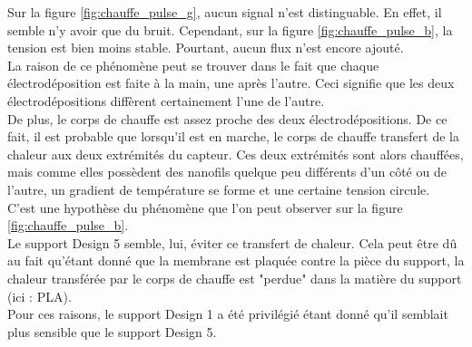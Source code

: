 Sur la figure \ref{fig:chauffe_pulse_g}, aucun signal n'est distinguable. En effet, il semble n'y avoir que du bruit. Cependant, sur la figure
\ref{fig:chauffe_pulse_b}, la tension est bien moins stable. Pourtant, aucun flux n'est encore ajouté. \\

La raison de ce phénomène peut se trouver dans le fait que chaque électrodéposition est faite à la main, une après l'autre. Ceci signifie que
les deux électrodépositions diffèrent certainement l'une de l'autre. \\
De plus, le corps de chauffe est assez proche des deux électrodépositions. De ce fait, il est probable que lorsqu'il est en marche, le corps de
chauffe transfert de la chaleur aux deux extrémités du capteur. Ces deux extrémités sont alors chauffées, mais comme elles possèdent des nanofils
quelque peu différents d'un côté ou de l'autre, un gradient de température se forme et une certaine tension circule. \\
C'est une hypothèse du phénomène que l'on peut observer sur la figure \ref{fig:chauffe_pulse_b}.\\

Le support Design 5 semble, lui, éviter ce transfert de chaleur. Cela peut être dû au fait qu'étant donné que la membrane est plaquée contre
la pièce du support, la chaleur transférée par le corps de chauffe est "perdue" dans la matière du support (ici : PLA).\\

Pour ces raisons, le support Design 1 a été privilégié étant donné qu'il semblait plus sensible que le support Design 5.\\

